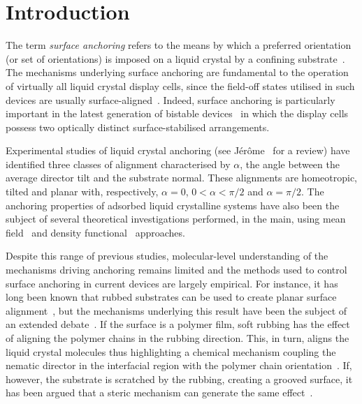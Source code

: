 \documentclass[aps,10pt,twocolumn]{revtex4}
\begin{document}
\maketitle
\section{Introduction}
The term \emph{surface anchoring} refers to the means by which a preferred orientation (or set of orientations) is
imposed on a liquid crystal by a confining substrate~\cite{Jerome91}. The mechanisms underlying surface anchoring
are fundamental to the operation of virtually all liquid crystal display cells, since the field-off states
utilised in such devices are usually surface-aligned~\cite{Shanks82,Geelhaar98}. Indeed, surface anchoring is
particularly important in the latest generation of bistable devices~\cite{ZBD,DennistonYeomans,DavidsonMottram02}
in which the display cells possess two optically distinct surface-stabilised arrangements.

Experimental studies of liquid crystal anchoring (see J\'{e}r\^ome~\cite{Jerome91} for a review) have identified
three classes of alignment characterised by $\alpha$, the angle between the average director tilt and the
substrate normal. These alignments are homeotropic, tilted and planar with, respectively, $\alpha=0$, $0 < \alpha
<\pi/2$ and $\alpha = \pi/2$. The anchoring properties of adsorbed liquid crystalline systems have also been the
subject of several theoretical investigations performed, in the main, using mean
field~\cite{TjiptoMargoSullivan88,DelRioTeloDaGamma95} and density
functional~\cite{OsipovHess93,Teixeira97,Allen99} approaches.

Despite this range of previous studies, molecular-level understanding of the mechanisms driving anchoring remains
limited and the methods used to control surface anchoring in current devices are largely empirical. For instance,
it has long been known that rubbed substrates can be used to create planar surface alignment~\cite{LuDeng98}, but
the mechanisms underlying this result have been the subject of an extended debate~\cite{ChenFeller89}. If the
surface is a polymer film, soft rubbing has the effect of aligning the polymer chains in the rubbing direction.
This, in turn, aligns the liquid crystal molecules thus highlighting a chemical mechanism coupling the nematic
director in the interfacial region with the polymer chain orientation~\cite{Clark85,GearyGoodby87}. If, however,
the substrate is scratched by the rubbing, creating a grooved surface, it has been argued that a steric mechanism
can generate the same effect~\cite{Berreman72}.
\end{document}
